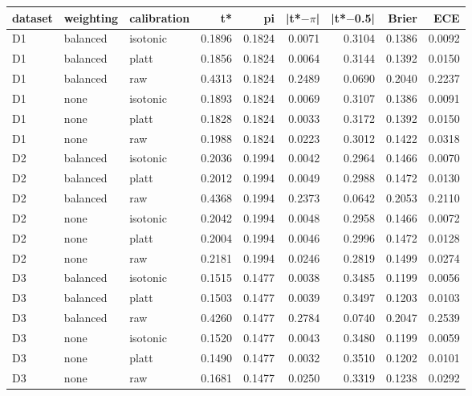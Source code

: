 \begin{tabular}{lllrrrrrr}
\toprule
dataset & weighting & calibration & t* & pi & |t*$-$$\pi$| & |t*$-$0.5| & Brier & ECE \\
\midrule
D1 & balanced & isotonic & 0.1896 & 0.1824 & 0.0071 & 0.3104 & 0.1386 & 0.0092 \\
D1 & balanced & platt & 0.1856 & 0.1824 & 0.0064 & 0.3144 & 0.1392 & 0.0150 \\
D1 & balanced & raw & 0.4313 & 0.1824 & 0.2489 & 0.0690 & 0.2040 & 0.2237 \\
D1 & none & isotonic & 0.1893 & 0.1824 & 0.0069 & 0.3107 & 0.1386 & 0.0091 \\
D1 & none & platt & 0.1828 & 0.1824 & 0.0033 & 0.3172 & 0.1392 & 0.0150 \\
D1 & none & raw & 0.1988 & 0.1824 & 0.0223 & 0.3012 & 0.1422 & 0.0318 \\
D2 & balanced & isotonic & 0.2036 & 0.1994 & 0.0042 & 0.2964 & 0.1466 & 0.0070 \\
D2 & balanced & platt & 0.2012 & 0.1994 & 0.0049 & 0.2988 & 0.1472 & 0.0130 \\
D2 & balanced & raw & 0.4368 & 0.1994 & 0.2373 & 0.0642 & 0.2053 & 0.2110 \\
D2 & none & isotonic & 0.2042 & 0.1994 & 0.0048 & 0.2958 & 0.1466 & 0.0072 \\
D2 & none & platt & 0.2004 & 0.1994 & 0.0046 & 0.2996 & 0.1472 & 0.0128 \\
D2 & none & raw & 0.2181 & 0.1994 & 0.0246 & 0.2819 & 0.1499 & 0.0274 \\
D3 & balanced & isotonic & 0.1515 & 0.1477 & 0.0038 & 0.3485 & 0.1199 & 0.0056 \\
D3 & balanced & platt & 0.1503 & 0.1477 & 0.0039 & 0.3497 & 0.1203 & 0.0103 \\
D3 & balanced & raw & 0.4260 & 0.1477 & 0.2784 & 0.0740 & 0.2047 & 0.2539 \\
D3 & none & isotonic & 0.1520 & 0.1477 & 0.0043 & 0.3480 & 0.1199 & 0.0059 \\
D3 & none & platt & 0.1490 & 0.1477 & 0.0032 & 0.3510 & 0.1202 & 0.0101 \\
D3 & none & raw & 0.1681 & 0.1477 & 0.0250 & 0.3319 & 0.1238 & 0.0292 \\
\bottomrule
\end{tabular}
